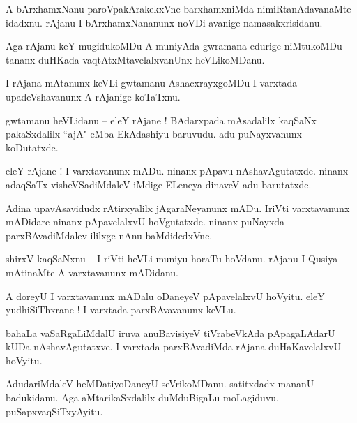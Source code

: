 \documentclass{article}
\begin{document}
\begin{mn}%
A bArxhamxNanu paroVpakArakekxVne barxhamxniMda nimiRtanAdavanaMte idadxnu. rAjanu I 
bArxhamxNananunx noVDi avanige namasakxrisidanu.
\end{mn}

\begin{mn}%
Aga rAjanu keY mugidukoMDu A muniyAda gwramana edurige niMtukoMDu tananx duHKada 
vaqtAtxMtavelalxvanUnx heVLikoMDanu.
\end{mn}

\begin{mn}%
I rAjana mAtanunx keVLi gwtamanu AshacxrayxgoMDu I varxtada upadeVshavanunx A rAjanige koTaTxnu.
\end{mn}

\begin{mn}%
gwtamanu heVLidanu -- eleY rAjane ! BAdarxpada mAsadalilx kaqSaNx pakaSxdalilx ``ajA" eMba 
EkAdashiyu baruvudu. adu puNayxvanunx koDutatxde.
\end{mn}

\begin{mn}%
eleY rAjane ! I varxtavanunx mADu. ninanx pApavu nAshavAgutatxde. ninanx adaqSaTx visheVSadiMdaleV 
iMdige ELeneya dinaveV adu barutatxde.
\end{mn}

\begin{mn}%
Adina upavAsavidudx rAtirxyalilx jAgaraNeyanunx mADu. IriVti varxtavanunx mADidare ninanx 
pApavelalxvU hoVgutatxde. ninanx puNayxda parxBAvadiMdalev ililxge nAnu baMdidedxVne.
\end{mn}

\begin{mn}%
shirxV kaqSaNxnu -- I riVti heVLi muniyu horaTu hoVdanu. rAjanu I Qusiya mAtinaMte A varxtavanunx 
mADidanu.
\end{mn}

\begin{mn}%
A doreyU I varxtavanunx mADalu oDaneyeV pApavelalxvU hoVyitu. eleY yudhiSiThxrane ! I varxtada 
parxBAvavanunx keVLu.
\end{mn}

\begin{mn}%
bahaLa vaSaRgaLiMdalU iruva anuBavisiyeV tiVrabeVkAda pApagaLAdarU kUDa nAshavAgutatxve. I varxtada 
parxBAvadiMda rAjana duHaKavelalxvU hoVyitu.
\end{mn}

\begin{mn}%
AdudariMdaleV heMDatiyoDaneyU seVrikoMDanu. satitxdadx mananU badukidanu. Aga aMtarikaSxdalilx 
duMduBigaLu moLagiduvu. puSapxvaqSiTxyAyitu.
\end{mn}
\end{document}
